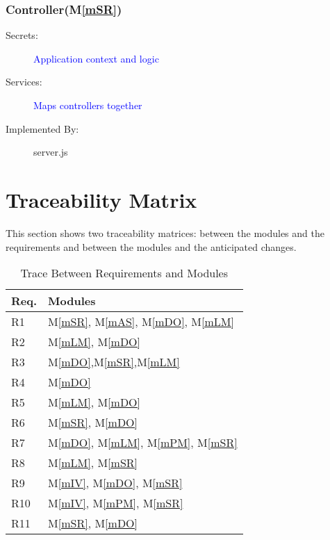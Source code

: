 \documentclass[12pt, titlepage]{article}
\newcommand{\mref}[1]{M\ref{#1}}
\begin{document}
\subsubsection{Controller(\mref{mSR})}


\begin{description}
\item[Secrets:] \textcolor{blue}{Application context and logic}
\item[Services:] \textcolor{blue}{Maps controllers together}
\item[Implemented By:] server.js
\end{description}





\section{Traceability Matrix} \label{SecTM}


This section shows two traceability matrices: between the modules and the
requirements and between the modules and the anticipated changes.


\begin{table}[H]
\centering
\begin{tabular}{p{} p{}}
\toprule
\textbf{Req.} & \textbf{Modules}\\
\midrule
R1 & \mref{mSR}, \mref{mAS}, \mref{mDO}, \mref{mLM}\\
R2 & \mref{mLM}, \mref{mDO}\\
R3 & \mref{mDO},\mref{mSR},\mref{mLM}\\
R4 & \mref{mDO}\\
R5 & \mref{mLM}, \mref{mDO}\\
R6 & \mref{mSR}, \mref{mDO}\\
R7 & \mref{mDO}, \mref{mLM}, \mref{mPM}, \mref{mSR}\\
R8 & \mref{mLM}, \mref{mSR}\\
R9 & \mref{mIV}, \mref{mDO}, \mref{mSR}\\
R10 & \mref{mIV}, \mref{mPM}, \mref{mSR}\\
R11 & \mref{mSR}, \mref{mDO}\\
\bottomrule
\end{tabular}
\caption{Trace Between Requirements and Modules}
\label{TblRT}
\end{table}
\end{document}
